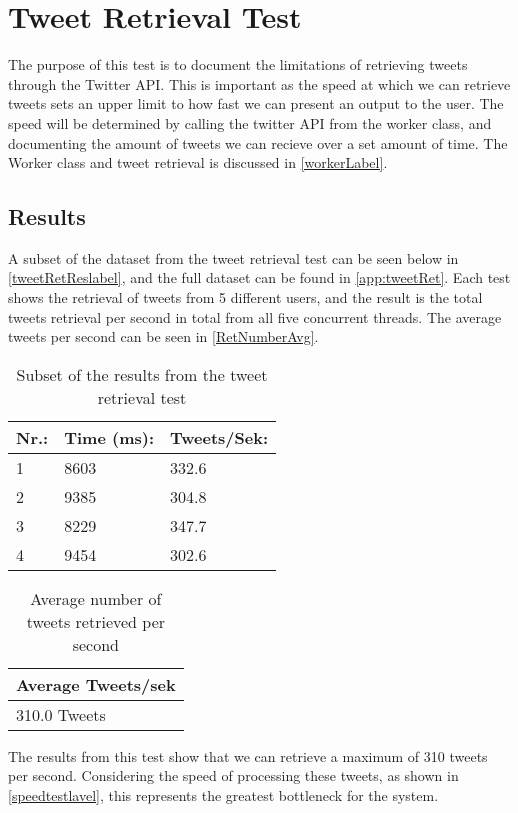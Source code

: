 \section{Tweet Retrieval Test}
The purpose of this test is to document the limitations of retrieving tweets
through the Twitter API. This is important as the speed at which we can retrieve
tweets sets an upper limit to how fast we can present an output to the user.
The speed will be determined by calling the twitter API from the worker class,
and documenting the amount of tweets we can recieve over a set amount of time.
The Worker class and tweet retrieval is discussed in \autoref{workerLabel}.

\subsection*{Results}
A subset of the dataset from the tweet retrieval test can be seen below in
\autoref{tweetRetReslabel}, and the full dataset can be found in
\autoref{app:tweetRet}.
Each test shows the retrieval of tweets from 5 different users, and the result is the total tweets retrieval per second in
total from all five concurrent threads. The average tweets per second can be
seen in \autoref{RetNumberAvg}. 

\begin{table}[H]\centering
\begin{tabular}{|l|l|l|}
\hline
\textbf{Nr.:}	&	\textbf{Time (ms):}	&	\textbf{Tweets/Sek:} \\\hline
1	&	8603	&	332.6\\\hline
2	&	9385	&	304.8\\\hline
3	&	8229	&	347.7\\\hline
4	&	9454	&	302.6\\\hline
\end{tabular}
\caption{Subset of the results from the tweet retrieval test}
\label{tweetRetReslabel}
\end{table}

\begin{table}[H]\centering
\begin{tabular}{|l|}\hline
\textbf{Average Tweets/sek}	\\\hline
310.0 Tweets \\\hline
\end{tabular}
\caption{Average number of tweets retrieved per second}
\label{RetNumberAvg}
\end{table}

The results from this test show that we can retrieve a maximum of 310 tweets per
second. Considering the speed of processing these tweets, as shown in
\autoref{speedtestlavel}, this represents the greatest bottleneck for the
system.
 




